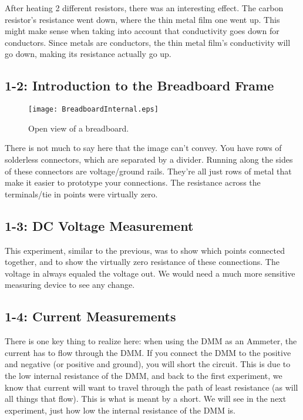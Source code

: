 \documentclass[%
 aip,
 jmp,
 amsmath,
 amssymb,
 reprint,%
 numerical,
 longbibliography,
]{revtex4-1}
\begin{document}
	After heating 2 different resistors, there was an interesting effect. The carbon
	resistor's resistance went down, where the thin metal film one went up. This might make
	sense when taking into account that conductivity goes down for conductors. Since metals
	are conductors, the thin metal film's conductivity will go down, making its resistance
	actually go up.
	
	\subsection{1-2: Introduction to the Breadboard Frame}
	
	\begin{figure}[H]
	\texttt{[image: BreadboardInternal.eps]}
	\caption{\label{fig1}Open view of a breadboard.}
	\end{figure}
	
	There is not much to say here that the image can't convey. You have rows of solderless
	connectors, which are separated by a divider. Running along the sides of these connectors
	are voltage/ground rails. They're all just rows of metal that make it easier to prototype
	your connections. The resistance across the terminals/tie in points were virtually zero.
	
	\subsection{1-3: DC Voltage Measurement}
	
	This experiment, similar to the previous, was to show which points connected together, and
	to show the virtually zero resistance of these connections. The voltage in always equaled
	the voltage out. We would need a much more sensitive measuring device to see any change.
	
	\subsection{1-4: Current Measurements}
	
	There is one key thing to realize here: when using the DMM as an Ammeter, the current
	has to flow through the DMM. If you connect the DMM to the positive and negative (or 
	positive and ground), you will short the circuit. This is due to the low internal
	resistance of the DMM, and back to the first experiment, we know that current will want
	to travel through the path of least resistance (as will all things that flow). This is
	what is meant by a short. We will see in the next experiment, just how low the internal
	resistance of the DMM is. 
	
\end{document}
